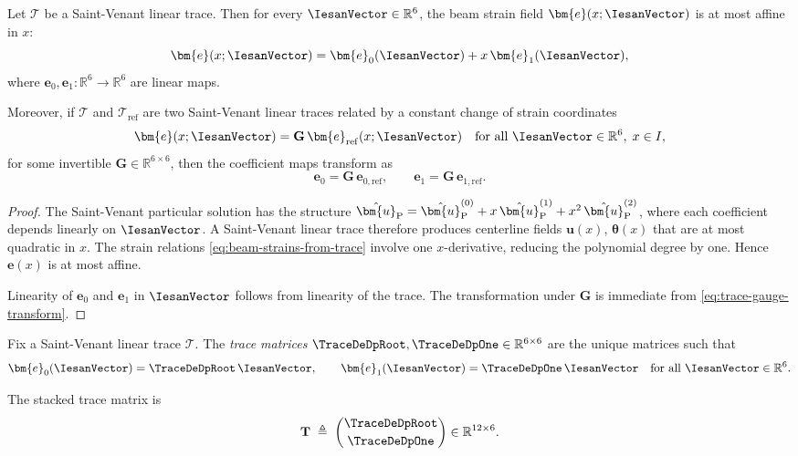 \begin{proposition}
\label{prop:affine-strains}
Let $\mathcal{T}$ be a Saint-Venant linear trace. Then for every 
$\IesanVector \in \mathbb{R}^6$, the beam strain field $\bm{e}(x;\IesanVector)$ 
is at most affine in $x$:
\begin{equation}
\bm{e}(x;\IesanVector)
=
\bm{e}_0(\IesanVector) + x\,\bm{e}_1(\IesanVector),
\label{eq:affine-strains}
\end{equation}
where $\bm{e}_0,\bm{e}_1 : \mathbb{R}^6 \to \mathbb{R}^6$ are linear maps.

Moreover, if $\mathcal{T}$ and $\mathcal{T}_{\mathrm{ref}}$ are two Saint-Venant 
linear traces related by a constant change of strain coordinates
\begin{equation}
\bm{e}(x;\IesanVector)
=
\mathbf{G}\,\bm{e}_{\mathrm{ref}}(x;\IesanVector)
\quad
\text{for all }\IesanVector\in\mathbb{R}^6,\; x\in I,
\label{eq:trace-gauge-transform}
\end{equation}
for some invertible $\mathbf{G} \in \mathbb{R}^{6\times 6}$, then the 
coefficient maps transform as
\[
\bm{e}_0 = \mathbf{G}\,\bm{e}_{0,\mathrm{ref}},
\qquad
\bm{e}_1 = \mathbf{G}\,\bm{e}_{1,\mathrm{ref}}.
\]
\end{proposition}

\begin{proof}
The Saint-Venant particular solution has the structure 
$\hat{\bm{u}}_{\rm P} = \hat{\bm{u}}_{\rm P}^{(0)} + x\,\hat{\bm{u}}_{\rm P}^{(1)} 
+ x^2\,\hat{\bm{u}}_{\rm P}^{(2)}$, where each coefficient depends linearly on 
$\IesanVector$. A Saint-Venant linear trace therefore produces centerline fields 
$\bm{u}(x)$, $\bm{\theta}(x)$ that are at most quadratic in $x$. The strain 
relations \eqref{eq:beam-strains-from-trace} involve one $x$-derivative, 
reducing the polynomial degree by one. Hence $\bm{e}(x)$ is at most affine.

Linearity of $\bm{e}_0$ and $\bm{e}_1$ in $\IesanVector$ follows from linearity 
of the trace. The transformation under $\mathbf{G}$ is immediate from 
\eqref{eq:trace-gauge-transform}.
\end{proof}


\begin{definition}
\label{def:trace-matrices}
Fix a Saint-Venant linear trace $\mathcal{T}$. The \emph{trace matrices} 
$\TraceDeDpRoot,\TraceDeDpOne \in \mathbb{R}^{6\times 6}$ are the unique matrices 
such that
\begin{equation}
\bm{e}_0(\IesanVector) = \TraceDeDpRoot\,\IesanVector,
\qquad
\bm{e}_1(\IesanVector) = \TraceDeDpOne\,\IesanVector
\quad
\text{for all }\IesanVector\in\mathbb{R}^6.
\label{eq:def-T0-T1}
\end{equation}

The stacked trace matrix is
\begin{equation}
\mathbf{T}
\;\triangleq\;
\begin{pmatrix}
\TraceDeDpRoot \\[2pt]
\TraceDeDpOne
\end{pmatrix}
\in \mathbb{R}^{12\times 6}.
\label{eq:def-Tstack}
\end{equation}
\end{definition}

